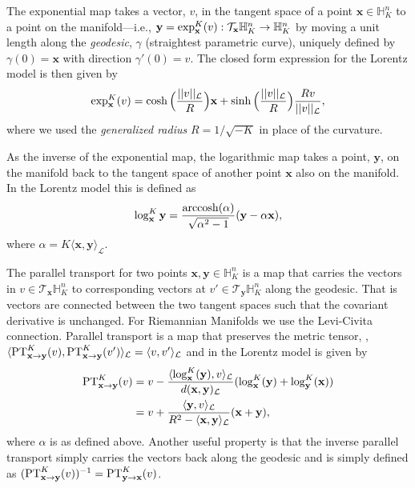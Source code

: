 The exponential map takes a vector, $v$, in the tangent space of a point $\textbf{x} \in \mathbb{H}^{n}_K$ to a point on the manifold---i.e., $\textbf{y} = \textnormal{exp}^K_\textbf{x}(v): \mathcal{T}_{\textbf{x}} \mathbb{H}^{n}_K \to \mathbb{H}^{n}_K$ by moving a unit length along the \textit{geodesic}, $\gamma$ (straightest parametric curve), uniquely defined by $\gamma(0) = \textbf{x}$ with direction $\gamma '(0)= v$. The closed form expression for the Lorentz model is then given by
\begin{equation}
    \label{eqn:exp_map}
    \textnormal{exp}^K_{\textbf{x}} (v) = \cosh \Big(\frac{||v||_{\mathcal{L}}}{R} \Big)\textbf{x} +  \sinh \Big(\frac{||v||_{\mathcal{L}}}{R} \Big)\frac{Rv}{||{v}||_{\mathcal{L}}},
\end{equation}
where we used the \textit{generalized radius} $R = 1/\sqrt{-K}$ in place of the curvature.

As the inverse of the exponential map, the logarithmic map takes a point, $\textbf{y}$, on the manifold back to the tangent space of another point $\textbf{x}$ also on the manifold. In the Lorentz model this is defined as
\begin{equation}
    \label{eqn:log_map}
    \log^K_{\textbf{x}}{\textbf{y}} = \frac{\operatorname{arccosh}(\alpha)}{\sqrt{\alpha^2 - 1}}(\textbf{y} - \alpha \textbf{x}),
\end{equation}
where $\alpha = K\langle \textbf{x}, \textbf{y} \rangle_{\mathcal{L}}$.

The parallel transport for two points $\textbf{x},\textbf{y} \in \mathbb{H}^{n}_K$ is a map that carries the vectors in $v \in \mathcal{T}_{\textbf{x}}\mathbb{H}^{n}_K$ to corresponding vectors at $v' \in \mathcal{T}_{\textbf{y}}\mathbb{H}^{n}_K$ along the geodesic. That is vectors are connected between the two tangent spaces such that the covariant derivative is unchanged. For Riemannian Manifolds we use the Levi-Civita connection. Parallel transport is a map that preserves the metric tensor, \ie, $\langle \textnormal{PT}^K_{\textbf{x} \to \textbf{y}}(v), \textnormal{PT}^K_{\textbf{x} \to \textbf{y}}(v') \rangle_{\mathcal{L}} = \langle v, v' \rangle_{\mathcal{L}}$ and in the Lorentz model is given by
\begin{align}
    \label{eqn:parallel_transport}
    \textnormal{PT}^K_{\textbf{x} \to \textbf{y}}(v) & = v - \frac{ \langle \log^K_{\textbf{x}}(\textbf{y}), v \rangle_{\mathcal{L}}}{d(\textbf{x},\textbf{y})_{\mathcal{L}}} (\log^K_{\textbf{x}}(\textbf{y})+ \log^K_{\textbf{y}}(\textbf{x})) \nonumber \\
    & = v + \frac{ \langle \textbf{y}, v \rangle_{\mathcal{L}}}{R^2 - \langle \textbf{x}, \textbf{y} \rangle_{\mathcal{L}}} (\textbf{x}+ \textbf{y}),
\end{align}
where $\alpha$ is as defined above. Another useful property is that the inverse parallel transport simply carries the vectors back along the geodesic and is simply defined as $(\textnormal{PT}^{K}_{\textbf{x} \to \textbf{y}}(v))^{-1} = \textnormal{PT}^K_{\textbf{y} \to \textbf{x}}(v)$.

